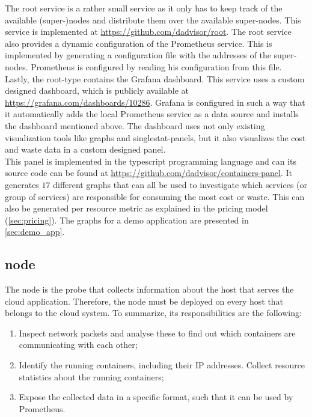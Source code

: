 \noindent
The root service is a rather small service as it only has to keep track of the available (super-)nodes and distribute them over the available super-nodes. This service is implemented at \url{https://github.com/dadvisor/root}. The root service also provides a dynamic configuration of the Prometheus service. This is implemented by generating a configuration file with the addresses of the super-nodes. Prometheus is configured by reading his configuration from this file.\\

\noindent
Lastly, the root-type contains the Grafana dashboard. This service uses a custom designed dashboard, which is publicly available at \url{https://grafana.com/dashboards/10286}. Grafana is configured in such a way that it automatically adds the local Prometheus service as a data source and installs the dashboard mentioned above. The dashboard uses not only existing visualization tools like graphs and singlestat-panels, but it also visualizes the cost and waste data in a custom designed panel.\\

\noindent
This panel is implemented in the typescript programming language and can its source code can be found at \url{https://github.com/dadvisor/containers-panel}. It generates $17$ different graphs that can all be used to investigate which services (or group of services) are responsible for consuming the most cost or waste. This can also be generated per resource metric as explained in the pricing model (\autoref{sec:pricing}). The graphs for a demo application are presented in \autoref{sec:demo_app}.

\subsection{node} \label{sec:node_imp}
The node is the probe that collects information about the host that serves the cloud application. Therefore, the node must be deployed on every host that belongs to the cloud system. To summarize, its responsibilities are the following:
\begin{enumerate}
    \item Inspect network packets and analyse these to find out which containers are communicating with each other;
    \item Identify the running containers, including their IP addresses. Collect resource statistics about the running containers;
    \item Expose the collected data in a specific format, such that it can be used by Prometheus.
\end{enumerate}

